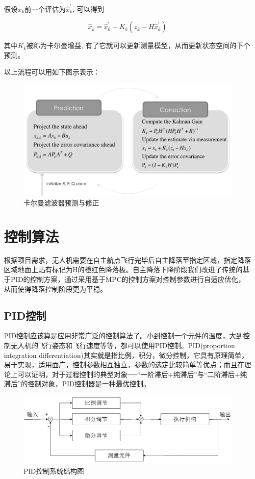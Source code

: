假设$\hat{x}_{k}$前一个评估为$\hat{x}_{k}^{\prime}$, 可以得到

$$
\hat{x}_{k}=\hat{x}_{k}^{\prime}+K_{k}\left(z_{k}-H \hat{x}_{k}^{\prime}\right)
$$

其中$K_{k}$被称为卡尔曼增益, 有了它就可以更新测量模型，从而更新状态空间的下个预测。

以上流程可以用如下图示表示：

\begin{figure}[ht]
  \centering
  \includegraphics[width=0.8\linewidth]{./Figure/Kalman_Prediction_and_Correction.png}
  \caption{卡尔曼滤波器预测与修正}\label{Fig:img3}
\end{figure}

\section{控制算法}

根据项目需求，无人机需要在自主航点飞行完毕后自主降落至指定区域，指定降落区域地面上贴有标记为H的橙红色降落板。自主降落下降阶段我们改进了传统的基于PID的控制方案，通过采用基于MPC的控制方案对控制参数进行自适应优化，从而使得降落控制阶段更为平稳。

\subsection{PID控制}

PID控制应该算是应用非常广泛的控制算法了。小到控制一个元件的温度，大到控制无人机的飞行姿态和飞行速度等等，都可以使用PID控制。PID(proportion integration differentiation)其实就是指比例，积分，微分控制，它具有原理简单，易于实现，适用面广，控制参数相互独立，参数的选定比较简单等优点；而且在理论上可以证明，对于过程控制的典型对象──“一阶滞后+纯滞后”与“二阶滞后+纯滞后”的控制对象，PID控制器是一种最优控制\cite{ArtE2}。

\begin{figure}[ht]
  \centering
  \includegraphics[width=0.8\linewidth]{./Figure/PID_Graph.png}
  \caption{PID控制系统结构图}\label{Fig:img4}
\end{figure}

